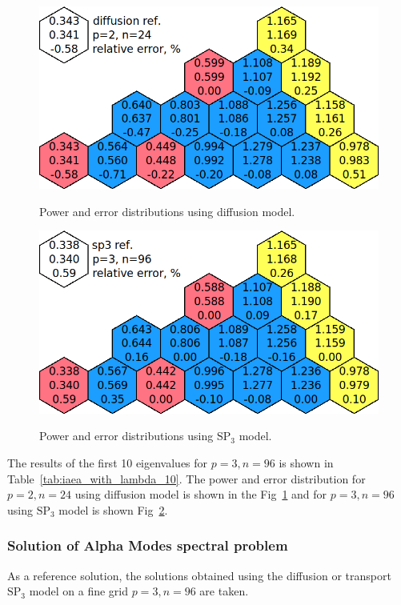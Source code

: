 \documentclass[authoryear]{elsarticle}
\begin{document}
\begin{figure}[h]
\begin{center}
	\includegraphics[width=0.85\linewidth]{diff_p2n24.png}\\
	\caption{Power and error distributions using diffusion model.}
	\label{fig:power_iaea_with_dif}
\end{center}
\end{figure}
\begin{figure}[h]
\begin{center}
	\includegraphics[width=0.85\linewidth]{sp3_p3n96.png}\\
	\caption{Power and error distributions using $\mathrm{SP_3}$ model.}
	\label{fig:power_iaea_with_sp3}
\end{center}
\end{figure}

The results of the first 10 eigenvalues for $ p = 3, n = 96 $ is shown in Table~\ref{tab:iaea_with_lambda_10}.
The power and error distribution for $p = 2, n = 24$ using diffusion model is shown in the Fig~\ref{fig:power_iaea_with_dif} and for $p = 3, n = 96$ using $\mathrm{SP_3}$ model is shown Fig~\ref{fig:power_iaea_with_sp3}.

\subsubsection{Solution of Alpha Modes spectral problem}
As a reference solution, the solutions obtained using the diffusion or transport $\mathrm{SP_3}$ model on a fine grid $ p = 3, n = 96 $ are taken.
 
\end{document}
